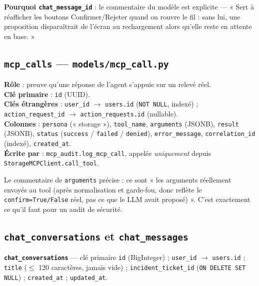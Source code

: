\documentclass[11pt,a4paper]{report}
\newcommand{\file}[1]{\texttt{\small #1}}
\newcommand{\fn}[1]{\texttt{\small\textcolor{oasisviolet}{#1}}}
\newcommand{\tbl}[1]{\texttt{\small\textcolor{oasisamber}{#1}}}
\newcommand{\arrowto}{\ensuremath{\rightarrow}}
\begin{document}
\textbf{Pourquoi \texttt{chat\_message\_id}} : le commentaire du modèle est
explicite --- « Sert à réafficher les boutons Confirmer/Rejeter quand on rouvre
le fil : sans lui, une proposition disparaîtrait de l'écran au rechargement
alors qu'elle reste en attente en base. »

\subsection{\tbl{mcp\_calls} --- \file{models/mcp\_call.py}}

\textbf{Rôle} : preuve qu'une réponse de l'agent s'appuie sur un relevé réel.\\
\textbf{Clé primaire} : \texttt{id} (UUID).\\
\textbf{Clés étrangères} : \texttt{user\_id} \arrowto{} \texttt{users.id}
(\texttt{NOT NULL}, indexé) ; \texttt{action\_request\_id} \arrowto{}
\texttt{action\_requests.id} (nullable).\\
\textbf{Colonnes} : \texttt{persona} (« storage »), \texttt{tool\_name},
\texttt{arguments} (JSONB), \texttt{result} (JSONB), \texttt{status}
(\texttt{success} / \texttt{failed} / \texttt{denied}), \texttt{error\_message},
\texttt{correlation\_id} (indexé), \texttt{created\_at}.\\
\textbf{Écrite par} : \fn{mcp\_audit.log\_mcp\_call}, appelée \emph{uniquement}
depuis \fn{StorageMCPClient.call\_tool}.

\begin{infobox}
Le commentaire de \texttt{arguments} précise : ce sont « les arguments réellement
envoyés au tool (après normalisation et garde-fou, donc reflète le
\texttt{confirm=True/False} réel, pas ce que le LLM avait proposé) ». C'est
exactement ce qu'il faut pour un audit de sécurité.
\end{infobox}

\subsection{\tbl{chat\_conversations} et \tbl{chat\_messages}}

\textbf{\tbl{chat\_conversations}} --- clé primaire \texttt{id} (BigInteger) ;
\texttt{user\_id} \arrowto{} \texttt{users.id} ; \texttt{title}
(\(\le\) 120 caractères, jamais vide) ; \texttt{incident\_ticket\_id}
(\texttt{ON DELETE SET NULL}) ; \texttt{created\_at} ; \texttt{updated\_at}.
\end{document}
